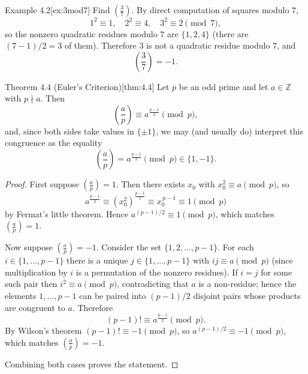 \documentclass[10pt]{article}
\theoremstyle{definition}
\theoremstyle{plain}
\numberwithin{equation}{section}
\begin{document}
\begin{define}{Example 4.2}[ex:3mod7]
Find $\left(\frac{3}{7}\right)$.  By direct computation of squares modulo $7$,
\[
1^2\equiv 1,\quad 2^2\equiv 4,\quad 3^2\equiv 2 \pmod{7},
\]
so the nonzero quadratic residues modulo $7$ are $\{1,2,4\}$ (there are $(7-1)/2=3$ of them).
Therefore $3$ is not a quadratic residue modulo $7$, and
\[
\left(\frac{3}{7}\right)=-1.
\]
\end{define}

\bigskip

\begin{define}{Theorem 4.4 (Euler's Criterion)}[thm:4.4]
Let $p$ be an odd prime and let $a\in\mathbb{Z}$ with $p\nmid a$. Then
\[
\left(\frac{a}{p}\right) \equiv a^{\frac{p-1}{2}} \pmod p,
\]
and, since both sides take values in $\{\pm1\}$, we may (and usually do) interpret this congruence as the equality
\[
\left(\frac{a}{p}\right) = a^{\frac{p-1}{2}} \pmod p \in\{1,-1\}.
\]
\end{define}

\begin{proof}
First suppose $\left(\frac{a}{p}\right)=1$. Then there exists $x_0$ with $x_0^2\equiv a\pmod p$, so
\[
a^{\frac{p-1}{2}} \equiv (x_0^2)^{\frac{p-1}{2}} \equiv x_0^{\,p-1}\equiv 1\pmod p
\]
by Fermat's little theorem. Hence $a^{(p-1)/2}\equiv 1\pmod p$, which matches $\left(\frac{a}{p}\right)=1$.

Now suppose $\left(\frac{a}{p}\right)=-1$. Consider the set $\{1,2,\dots,p-1\}$. For each $i\in\{1,\dots,p-1\}$ there is a unique $j\in\{1,\dots,p-1\}$ with $ij\equiv a\pmod p$ (since multiplication by $i$ is a permutation of the nonzero residues). If $i=j$ for some such pair then $i^2\equiv a\pmod p$, contradicting that $a$ is a non-residue; hence the elements $1,\dots,p-1$ can be paired into $(p-1)/2$ disjoint pairs whose products are congruent to $a$. Therefore
\[
(p-1)!\equiv a^{\frac{p-1}{2}} \pmod p.
\]
By Wilson's theorem $(p-1)!\equiv -1\pmod p$, so $a^{(p-1)/2}\equiv -1\pmod p$, which matches $\left(\frac{a}{p}\right)=-1$.

Combining both cases proves the statement.
\end{proof}
\end{document}
